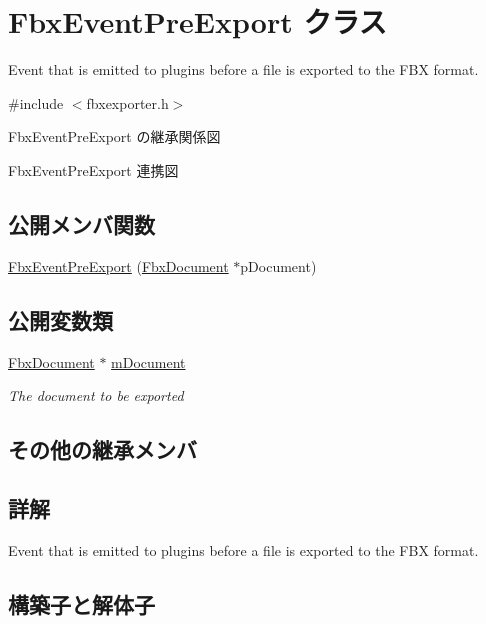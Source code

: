 \hypertarget{class_fbx_event_pre_export}{}\section{Fbx\+Event\+Pre\+Export クラス}
\label{class_fbx_event_pre_export}


Event that is emitted to plugins before a file is exported to the F\+BX format.  




{\ttfamily \#include $<$fbxexporter.\+h$>$}



Fbx\+Event\+Pre\+Export の継承関係図


Fbx\+Event\+Pre\+Export 連携図
\subsection*{公開メンバ関数}
\begin{DoxyCompactItemize}
\item 
\hyperlink{class_fbx_event_pre_export_a90642ec2d709d7bbb898df8248f848ba}{Fbx\+Event\+Pre\+Export} (\hyperlink{class_fbx_document}{Fbx\+Document} $\ast$p\+Document)
\end{DoxyCompactItemize}
\subsection*{公開変数類}
\begin{DoxyCompactItemize}
\item 
\hyperlink{class_fbx_document}{Fbx\+Document} $\ast$ \hyperlink{class_fbx_event_pre_export_aee74a30348fc851b3690a90c99b0a4b8}{m\+Document}
\begin{DoxyCompactList}\small\item\em The document to be exported \end{DoxyCompactList}\end{DoxyCompactItemize}
\subsection*{その他の継承メンバ}


\subsection{詳解}
Event that is emitted to plugins before a file is exported to the F\+BX format. 

\subsection{構築子と解体子}
\mbox{\label{class_fbx_event_pre_export_a90642ec2d709d7bbb898df8248f848ba}} 
